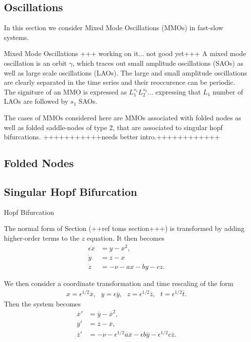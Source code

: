 \subsection{Oscillations} %
In this section we consider Mixed Mode Oscillations (MMOs) in fast-slow systems.

\begin{definition}{Mixed Mode Oscillations}
+++ working on it... not good yet+++
A mixed mode oscillation is an orbit $\gamma$, which traces out small amplitude oscillations (SAOs) as well as large scale oscillations (LAOs).
The large and small amplitude oscillations are clearly separated in the time series and their reoccurence can be periodic.
The signiture of an MMO is expressed as $L_1^{s_1}L_2^{s_2}...$ expressing that $L_1$ number of LAOs are followed by $s_1$ SAOs.
\end{definition}

The cases of MMOs considered here are MMOs associated with folded nodes as well as folded saddle-nodes of type 2, that are associated to singular hopf bifurcations.
+++++++++++needs better intro.++++++++++++

\subsection{ Folded Nodes}

\subsection{Singular Hopf Bifurcation}


\begin{definition}{Hopf Bifurcation}

\end{definition}



The normal form of Section (++ref toms section+++) is transformed by adding higher-order terms to the $z$ equation. It then becomes
\begin{align*}
\epsilon \dot{x} &= y - x^2, \\
\dot{y} &= z - x \\
\dot{z} &= - \nu -ax - by - cz.
\end{align*}

We then consider a coordinate transformation and time rescaling of the form 
\begin{align*}
x = \epsilon^{1/2}\overline{x}, \ \ \ y= \epsilon \overline{y},  \ \ \ z = \epsilon^{1/2} \overline{z},\ \ \  t= \epsilon^{1/2} \overline{t}.
\end{align*}
Then the system becomes
\begin{align*}
\overline{x}' &= \overline{y} - \overline{x}^2, \\
\overline{y}' &= \overline{z} - \overline{x}, \\
\overline{z}' &= - \nu - \epsilon^{1/2} a \overline{x} - \epsilon b \overline{y} - \epsilon^{1/2} c \overline{z}.
\end{align*}




